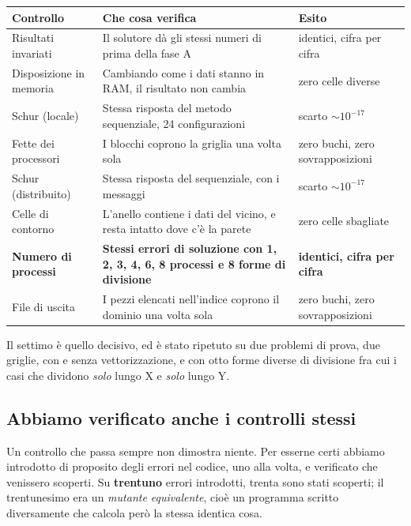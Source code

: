 \documentclass[11pt,a4paper]{article}
\begin{document}
\begin{center}
\begin{tabular}{@{}L{3.5cm}L{7.2cm}L{3.5cm}@{}}
\toprule
\textbf{Controllo} & \textbf{Che cosa verifica} & \textbf{Esito} \\
\midrule
Risultati invariati &
Il solutore dà gli stessi numeri di prima della fase A &
identici, cifra per cifra \\[4pt]
Disposizione in memoria &
Cambiando come i dati stanno in RAM, il risultato non cambia &
zero celle diverse \\[4pt]
Schur (locale) &
Stessa risposta del metodo sequenziale, 24 configurazioni &
scarto $\sim 10^{-17}$ \\[4pt]
Fette dei processori &
I blocchi coprono la griglia una volta sola &
zero buchi, zero sovrapposizioni \\[4pt]
Schur (distribuito) &
Stessa risposta del sequenziale, con i messaggi &
scarto $\sim 10^{-17}$ \\[4pt]
Celle di contorno &
L'anello contiene i dati del vicino, e resta intatto dove c'è la parete &
zero celle sbagliate \\[4pt]
\textbf{Numero di processi} &
\textbf{Stessi errori di soluzione con 1, 2, 3, 4, 6, 8 processi e 8 forme di divisione} &
\textbf{identici, cifra per cifra} \\[4pt]
File di uscita &
I pezzi elencati nell'indice coprono il dominio una volta sola &
zero buchi, zero sovrapposizioni \\
\bottomrule
\end{tabular}
\end{center}

\medskip
Il settimo è quello decisivo, ed è stato ripetuto su due problemi di prova, due
griglie, con e senza vettorizzazione, e con otto forme diverse di divisione fra
cui i casi che dividono \emph{solo} lungo X e \emph{solo} lungo Y.

\subsection*{Abbiamo verificato anche i controlli stessi}

Un controllo che passa sempre non dimostra niente. Per esserne certi abbiamo
introdotto di proposito degli errori nel codice, uno alla volta, e verificato
che venissero scoperti. Su \textbf{trentuno} errori introdotti, trenta sono
stati scoperti; il trentunesimo era un \emph{mutante equivalente}, cioè un
programma scritto diversamente che calcola però la stessa identica cosa.
\end{document}
